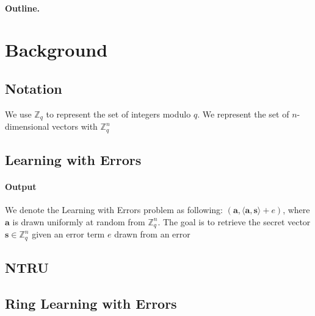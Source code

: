 \documentclass[11pt,
  titlepage=false,
  abstract=on,
]{scrreprt}
\begin{document}

\paragraph{Outline.}



\section{Background}
\label{sec:background}

\subsection{Notation}
We use $\mathbb{Z}_q$ to represent the set of integers modulo $q$. We represent the set of $n$-dimensional vectors with $\mathbb{Z}^n_q$
\subsection{Learning with Errors}
\paragraph{Output}
We denote the Learning with Errors problem as following: $(\mathbf{a}, \langle \mathbf{a}, \mathbf{s} \rangle + e)$, where $\mathbf{a}$ is
drawn uniformly at random from $\mathbb{Z}^n_q$. The goal is to retrieve the secret vector $\mathbf{s} \in \mathbb{Z}^n_q$ given an error term
$e$ drawn from an error 

\subsection{NTRU}
\subsection{Ring Learning with Errors}
\end{document}
